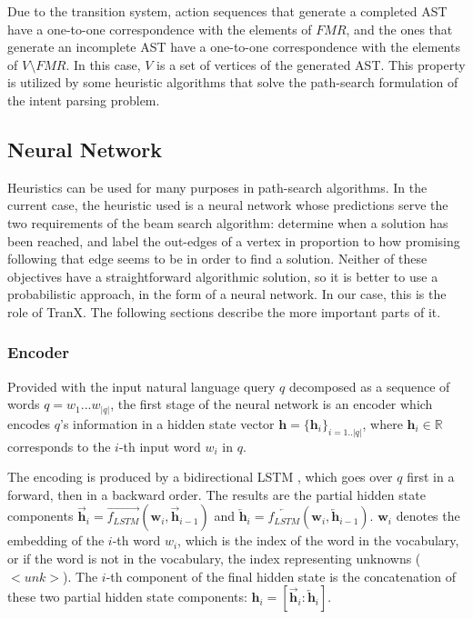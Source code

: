 Due to the transition system, action sequences that generate a completed
AST have a one-to-one correspondence with the elements of \(FMR\),
and the ones that generate an incomplete AST have a one-to-one correspondence
with the elements of \(V \setminus FMR\). In this case, \( V \) is a set
of vertices of the generated AST. This property is utilized by some
heuristic algorithms that solve the path-search formulation of
the intent parsing problem.

\subsection{Neural Network}

Heuristics can be used for many purposes in path-search algorithms. In the current
case, the heuristic used is a neural network whose predictions serve the two
requirements of the beam search algorithm: determine when a solution has been
reached, and label the out-edges of a vertex in proportion to how promising
following that edge seems to be in order to find a solution. Neither of these
objectives have a straightforward algorithmic solution, so it is better
to use a probabilistic approach, in the form of a neural network. In our case, 
this is the role of TranX. The following sections describe the more important
parts of it.

\subsubsection{Encoder}

Provided with the input natural language query \(q\) decomposed as a sequence
of words \(q = w_{1}...w_{|q|}\), the first stage of the neural network is an
encoder which encodes \(q\)'s information in a hidden state vector \(\mathbf{h} =
\{\mathbf{h}_{i}\}_{i=1..|q|}\), where \(\mathbf{h}_{i} \in \mathbb{R}\)
corresponds to the \(i\)-th input word \(w_{i}\) in \(q\).

The encoding is produced by a bidirectional LSTM \cite{HochreiterSchmidhuber1997,
SchusterPaliwal1997}, which goes over \(q\) first in a forward, then in a backward
order. The results are the partial hidden state components
\(\overrightarrow{\mathbf{h}}_{i} = \overrightarrow{f_{LSTM}}(\mathbf{w}_{i}, \overrightarrow{\mathbf{h}}_{i-1})\) and \(\overleftarrow{\mathbf{h}}_{i} =
\overleftarrow{f_{LSTM}}(\mathbf{w}_{i}, \overleftarrow{\mathbf{h}}_{i-1})\).
\(\mathbf{w}_{i}\) denotes the embedding of the \(i\)-th word \(w_{i}\), 
which is the index of the word in the vocabulary, or if the word is not
in the vocabulary, the index representing unknowns (\(<unk>\)).
The \(i\)-th component of the final hidden state is the concatenation of
these two partial hidden state components: \(\mathbf{h}_{i} = 
[\overrightarrow{\mathbf{h}}_{i} : \overleftarrow{\mathbf{h}}_{i}]\).

